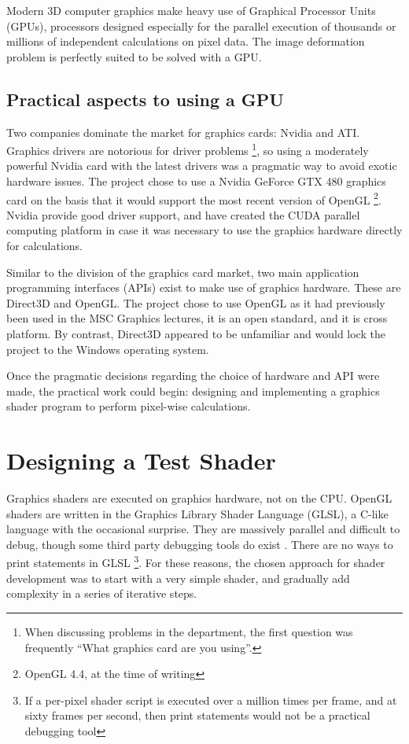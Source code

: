 \documentclass[MSc,paper=a4,pagesize=auto]{icldt}
\begin{document}
Modern 3D computer graphics make heavy use of Graphical Processor Units (GPUs), processors designed especially for the parallel execution of thousands or millions of independent calculations on pixel data. The image deformation problem is perfectly suited to be solved with a GPU. 

\subsection{Practical aspects to using a GPU}
Two companies dominate the market for graphics cards: Nvidia and ATI. Graphics drivers are notorious for driver problems \footnote{When discussing problems in the department, the first question was frequently ``What graphics card are you using''.}, so using a moderately powerful Nvidia card with the latest drivers was a pragmatic way to avoid exotic hardware issues. The project chose to use a Nvidia GeForce GTX 480 graphics card on the basis that it would support the most recent version of OpenGL \footnote{OpenGL 4.4, at the time of writing}. Nvidia provide good driver support, and have created the CUDA parallel computing platform in case it was necessary to use the graphics hardware directly for calculations.

Similar to the division of the graphics card market, two main application programming interfaces (APIs) exist to make use of graphics hardware. These are Direct3D and OpenGL. The project chose to use OpenGL as it had previously been used in the MSC Graphics lectures, it is an open standard, and it is cross platform. By contrast, Direct3D appeared to be unfamiliar and would lock the project to the Windows operating system.

Once the pragmatic decisions regarding the choice of hardware and API were made, the practical work could begin: designing and implementing a graphics shader program to perform pixel-wise calculations.

\section{Designing a Test Shader}
Graphics shaders are executed on graphics hardware, not on the CPU. OpenGL shaders are written in the Graphics Library Shader Language (GLSL), a C-like language with the occasional surprise. They are massively parallel and difficult to debug, though some third party debugging tools do exist \cite{glslDevil}. There are no ways to print statements in GLSL \footnote{If a per-pixel shader script is executed over a million times per frame, and at sixty frames per second, then print statements would not be a practical debugging tool}. For these reasons, the chosen approach for shader development was to start with a very simple shader, and gradually add complexity in a series of iterative steps. 
\end{document}
